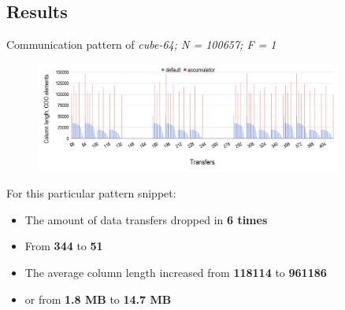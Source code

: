 \ifWithResults
\subsection{Results}



\begin{frame}[t]{Communication pattern of \textit{cube-64; N = 100657; F = 1}}
    \footnotesize
    
    \begin{figure}[htpb]
        \includegraphics[width=0.9\textwidth]{figures/chapter-3/benchmark-communication-pattern.png}
    \end{figure}
    
    For this particular pattern snippet:
    \begin{itemize}
        \item The amount of data transfers dropped in \textbf{6 times}
        \item From \textbf{344} to \textbf{51}
        \item The average column length increased from \textbf{118114} to \textbf{961186}
        \item or from \textbf{1.8 MB} to \textbf{14.7 MB}
    \end{itemize}

\end{frame}


